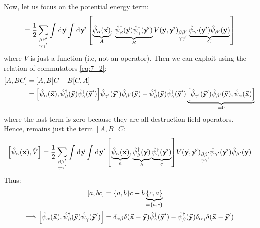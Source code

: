 \documentclass[../main/main.tex]{subfiles}
\begin{document}
Now, let us focus on the potential energy term: 
\begin{equation*}
  [\hat{\psi }_ \alpha  (\va{x}), \hat{V}  ] = \frac{1}{2}
  \sum_{\substack{ \beta \beta' \\ \gamma \gamma'} }^{}
  \int_{}^{} \dd[]{\va{y}} \int_{}^{} \dd[]{\va{y}'}
  \qty[ \underbrace{\hat{\psi }_ \alpha (\va{x}) }_{A}, \, \underbrace{\hat{\psi }_ \beta ^\dag  (\va{y}) \hat{\psi }_ \gamma ^\dag (\va{y}')   }_{B}   V(\va{y},\va{y}')_{ \substack{ \beta \beta' \\ \gamma \gamma' } }
  \underbrace{\hat{\psi }_ {\gamma'} (\va{y}') \hat{\psi }_ {\beta '} (\va{y}) }_{C}]
\end{equation*}
where \( V \) is just a function (i.e, not an operator).
Then we can exploit using the relation of commutators \eqref{eq:7_2}:
\begin{equation*}
\begin{split}
  [A,BC] &= [A,B]C - B[C,A] \\
  &= \qty[ \hat{\psi }_ \alpha (\va{x}), \hat{\psi }_ \beta ^\dag  (\va{y}) \hat{\psi }_ \gamma ^\dag (\va{y}')   ]  \hat{\psi }_ {\gamma'} (\va{y}') \hat{\psi }_ {\beta '} (\va{y})
  - \hat{\psi }_ \beta ^\dag  (\va{y}) \hat{\psi }_ \gamma ^\dag (\va{y}')  \underbrace{ \qty[ \hat{\psi }_ {\gamma'} (\va{y}') \hat{\psi }_ {\beta '} (\va{y}) ,  \hat{\psi }_ \alpha (\va{x}) ]  }_{=0}
\end{split}
\end{equation*}
where the last term is zero because they are all destruction field operators.
Hence, remains just the term \( [A,B]C \):
\begin{equation*}
  \qty[\hat{\psi }_ \alpha (\va{x}), \hat{V}  ] = \frac{1}{2}
  \sum_{\substack{\beta \beta'  \\ \gamma  \gamma'  } }^{}
  \int_{}^{} \dd[]{\va{y}} \int_{}^{} \dd[]{\va{y}'}
  \qty[ \underbrace{\hat{\psi }_ \alpha (\va{x})}_{a}, \underbrace{\hat{\psi }_ \beta  ^\dag (\va{y}) }_{b}  \underbrace{\hat{\psi }_ \gamma  ^\dag (\va{y}')  }_{c}  ]
  V(\va{y},\va{y}')_{  \substack{\beta \beta'  \\ \gamma  \gamma'  }  }      \hat{\psi }_ {\gamma' } (\va{y}') \hat{\psi }_{\beta'} (\va{y})
\end{equation*}
Thus:
\begin{equation*}
\begin{split}
[a,bc]  &= \{ a,b \}c - b \underbrace{\{ c,a \}  }_{= \{ a,c \}  }     \\
\Longrightarrow  \qty[ \hat{\psi }_ \alpha (\va{x}), \hat{\psi }_ \beta ^\dag (\va{y}) \hat{\psi }_ \gamma ^\dag (\va{y}')    ]
& = \delta _{\alpha \beta } \delta (\va{x}-\va{y}) \hat{\psi }_{\gamma  } ^\dag (\va{y}') - \hat{\psi }_ \beta ^\dag (\va{y}) \delta _{\alpha \gamma  } \delta (\va{x}-\va{y}')
\end{split}
\end{equation*}
\end{document}
